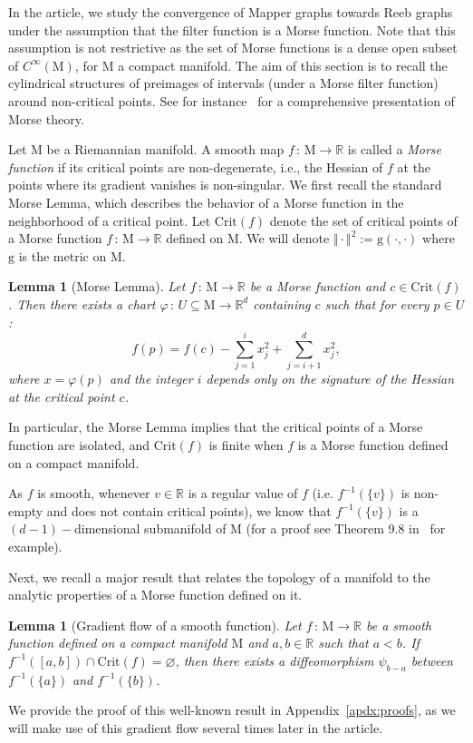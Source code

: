 \documentclass[pdflatex,sn-mathphys-ay]{sn-jnl}%
\newtheorem{lemma}[theorem]{Lemma}
\newcommand{\man}{\mathrm{M}}
\newcommand{\critic}{{\mathrm {Crit}}}
\newcommand{\g}{\mathrm{g}}
\newcommand{\R}{\mathbb{R}}
\newcommand{\preim}[2]{#1^{-1}(#2)}
\newcommand{\change}[1]{\noindent #1}
\theoremstyle{thmstyleone}%
\begin{document}
In the article, we study the convergence of Mapper graphs towards Reeb graphs under the assumption that the filter function is a Morse function. Note that this assumption is not restrictive as the set of Morse functions is a dense open subset of $C^{\infty}(\man)$, for $\man$ a compact manifold. The aim of this section is to recall the cylindrical structures of preimages of intervals (under a Morse filter function) around non-critical points. See for instance~\citet{milnor1963morse} for a comprehensive presentation of Morse theory.

Let $\man$ be a Riemannian manifold. \change{A} smooth map $f\,:\,\man\rightarrow \mathbb{R}$ is called a {\it Morse function} if its critical points are non-degenerate, i.e., the Hessian of $f$ at the points where its gradient vanishes is non-singular.  We first recall the standard Morse Lemma, which describes the behavior of a Morse function in the neighborhood of a critical point.  Let $\critic(f)$ denote the set of critical points of a Morse function $f\,:\,\man\rightarrow \R$ defined on $\man$. We will denote $\Vert\cdot\Vert^2:=\g(\cdot, \cdot)$ where $\g$ is the metric on $\man$.

\begin{lemma}[\change{Morse Lemma}]\label{lem:morse}
Let $f\,:\,\man\rightarrow \mathbb{R}$ be a Morse function and $c\in\critic(f)$. Then there exists a chart $\varphi\,:\,U\subseteq\man\rightarrow \mathbb{R}^d$ containing $c$ such that for every $p\in U$:
    $$f(p)=f(c)-\sum_{j=1}^ix_j^2+\sum_{j=i+1}^dx_j^2,$$
    where $x=\varphi(p)$ and the integer $i$ depends only on the signature of the Hessian at the critical point $c$.
\end{lemma}

In particular, the Morse Lemma implies that the critical points of a Morse function are isolated, and $\critic(f)$ is finite when $f$ is a Morse function defined on a compact manifold.

\change{As $f$ is smooth, whenever $v\in\mathbb{R}$ is a regular value of $f$ (i.e. $\preim{f}{\{v\}}$ is non-empty and does not contain critical points), we know that $\preim{f}{\{v\}}$ is a $(d-1)-$dimensional submanifold of $\man$ (for a proof see Theorem 9.8 in~\citet{tu2011manifolds} for example).}

Next, we recall a major result that relates the topology of a manifold to the analytic properties of a Morse function defined on it.

\begin{lemma}[\change{Gradient flow of a smooth function}]\label{lem:flow}
Let $f\,:\,\man\rightarrow \R$ be a smooth function defined on a compact manifold $\man$ and $a,b\in\R$ such that $a<b$.
If $\preim{f}{[a,b]}\cap \critic(f)=\varnothing$,
then there exists a diffeomorphism $\psi_{b-a}$ between $\preim{f}{\{a\}}$ and $\preim{f}{\{b\}}$.

\end{lemma}
We provide the proof of this well-known result \change{in Appendix~\ref{apdx:proofs}}, as we will make use of this gradient flow several times later in the article. 
\end{document}
